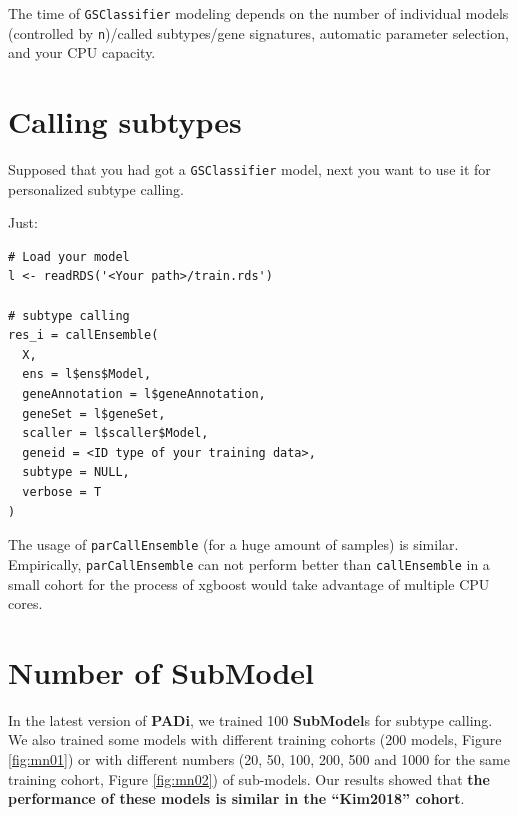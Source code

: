 \documentclass[
  12pt,
]{book}
\newcommand{\passthrough}[1]{#1}
\begin{document}
The time of \passthrough{\lstinline!GSClassifier!} modeling depends on the number of individual models (controlled by \passthrough{\lstinline!n!})/called subtypes/gene signatures, automatic parameter selection, and your CPU capacity.

\hypertarget{calling-subtypes}{%
\section{Calling subtypes}\label{calling-subtypes}}

Supposed that you had got a \passthrough{\lstinline!GSClassifier!} model, next you want to use it for personalized subtype calling.

Just:

\begin{lstlisting}
# Load your model
l <- readRDS('<Your path>/train.rds')

# subtype calling
res_i = callEnsemble(
  X,
  ens = l$ens$Model,
  geneAnnotation = l$geneAnnotation,
  geneSet = l$geneSet,
  scaller = l$scaller$Model,
  geneid = <ID type of your training data>,
  subtype = NULL,
  verbose = T
)
\end{lstlisting}

The usage of \passthrough{\lstinline!parCallEnsemble!} (for a huge amount of samples) is similar. Empirically, \passthrough{\lstinline!parCallEnsemble!} can not perform better than \passthrough{\lstinline!callEnsemble!} in a small cohort for the process of xgboost would take advantage of multiple CPU cores.

\hypertarget{topicSubmodel}{%
\section{Number of SubModel}\label{topicSubmodel}}

In the latest version of \textbf{PADi}, we trained 100 \textbf{SubModel}s for subtype calling. We also trained some models with different training cohorts (200 models, Figure \ref{fig:mn01}) or with different numbers (20, 50, 100, 200, 500 and 1000 for the same training cohort, Figure \ref{fig:mn02}) of sub-models. Our results showed that \textbf{the performance of these models is similar in the ``Kim2018'' cohort}.
\end{document}
